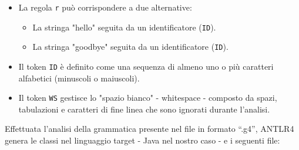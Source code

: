 \documentclass{article}
\begin{document}
\begin{itemize}
    \item La regola \texttt{r} può corrispondere a due alternative:
    \begin{itemize}
        \item La stringa "hello" seguita da un identificatore (\texttt{ID}).
        \item La stringa "goodbye" seguita da un identificatore (\texttt{ID}).
    \end{itemize}
    \item Il token \texttt{ID} è definito come una sequenza di almeno uno o più caratteri alfabetici (minuscoli o maiuscoli).
    \item Il token \texttt{WS} gestisce lo "spazio bianco" - whitespace - composto da spazi, tabulazioni e caratteri di fine linea che sono ignorati durante l'analisi.
   
\end{itemize}
Effettuata l’analisi della grammatica presente nel file in formato “.g4”, ANTLR4 genera le classi nel linguaggio target - Java nel nostro caso - e i seguenti file:
\end{document}
